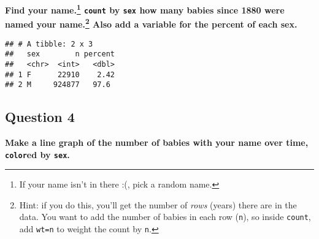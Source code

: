 \documentclass[
]{article}
\newenvironment{Shaded}{\begin{snugshade}}{\end{snugshade}}
\newcommand{\DataTypeTok}[1]{\textcolor[rgb]{0.13,0.29,0.53}{#1}}
\newcommand{\DecValTok}[1]{\textcolor[rgb]{0.00,0.00,0.81}{#1}}
\newcommand{\KeywordTok}[1]{\textcolor[rgb]{0.13,0.29,0.53}{\textbf{#1}}}
\newcommand{\NormalTok}[1]{#1}
\newcommand{\OperatorTok}[1]{\textcolor[rgb]{0.81,0.36,0.00}{\textbf{#1}}}
\newcommand{\StringTok}[1]{\textcolor[rgb]{0.31,0.60,0.02}{#1}}
\begin{document}
\textbf{Find your name.\footnote{If your name isn't in there :(, pick a
  random name.} \texttt{count} by \texttt{sex} how many babies since
1880 were named your name.\footnote{Hint: if you do this, you'll get the
  number of \emph{rows} (years) there are in the data. You want to add
  the number of babies in each row (\texttt{n}), so inside
  \texttt{count}, add \texttt{wt=n} to weight the count by \texttt{n}.}
Also add a variable for the percent of each sex.}

\begin{Shaded}
\end{Shaded}

\begin{verbatim}
## # A tibble: 2 x 3
##   sex        n percent
##   <chr>  <int>   <dbl>
## 1 F      22910    2.42
## 2 M     924877   97.6
\end{verbatim}

\hypertarget{question-4}{%
\subsection{Question 4}\label{question-4}}

\textbf{Make a line graph of the number of babies with your name over
time, \texttt{color}ed by \texttt{sex}.}
\end{document}
